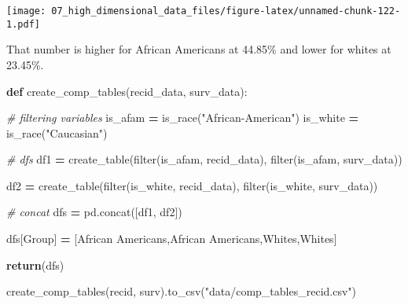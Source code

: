 \documentclass[
]{book}
\newenvironment{Shaded}{\begin{snugshade}}{\end{snugshade}}
\newcommand{\BuiltInTok}[1]{#1}
\newcommand{\CommentTok}[1]{\textcolor[rgb]{0.56,0.35,0.01}{\textit{#1}}}
\newcommand{\ControlFlowTok}[1]{\textcolor[rgb]{0.13,0.29,0.53}{\textbf{#1}}}
\newcommand{\KeywordTok}[1]{\textcolor[rgb]{0.13,0.29,0.53}{\textbf{#1}}}
\newcommand{\NormalTok}[1]{#1}
\newcommand{\OperatorTok}[1]{\textcolor[rgb]{0.81,0.36,0.00}{\textbf{#1}}}
\newcommand{\StringTok}[1]{\textcolor[rgb]{0.31,0.60,0.02}{#1}}
\begin{document}
\texttt{[image: 07\_high\_dimensional\_data\_files/figure-latex/unnamed-chunk-122-1.pdf]}

That number is higher for African Americans at 44.85\% and lower for whites at 23.45\%.

\begin{Shaded}
\begin{Highlighting}[]

\KeywordTok{def}\NormalTok{ create\_comp\_tables(recid\_data, surv\_data):}
  
    \CommentTok{\# filtering variables }
\NormalTok{    is\_afam }\OperatorTok{=}\NormalTok{ is\_race(}\StringTok{"African{-}American"}\NormalTok{)}
\NormalTok{    is\_white }\OperatorTok{=}\NormalTok{ is\_race(}\StringTok{"Caucasian"}\NormalTok{)}
  
    \CommentTok{\# dfs }
\NormalTok{    df1 }\OperatorTok{=}\NormalTok{ create\_table(}\BuiltInTok{filter}\NormalTok{(is\_afam, recid\_data),}
                       \BuiltInTok{filter}\NormalTok{(is\_afam, surv\_data))}
  
\NormalTok{    df2 }\OperatorTok{=}\NormalTok{ create\_table(}\BuiltInTok{filter}\NormalTok{(is\_white, recid\_data), }
                       \BuiltInTok{filter}\NormalTok{(is\_white, surv\_data))}
  
    \CommentTok{\# concat }
\NormalTok{    dfs }\OperatorTok{=}\NormalTok{ pd.concat([df1, df2])}
    
\NormalTok{    dfs[}\StringTok{\textquotesingle{}Group\textquotesingle{}}\NormalTok{] }\OperatorTok{=}\NormalTok{ [}\StringTok{\textquotesingle{}African Americans\textquotesingle{}}\NormalTok{,}\StringTok{\textquotesingle{}African Americans\textquotesingle{}}\NormalTok{,}\StringTok{\textquotesingle{}Whites\textquotesingle{}}\NormalTok{,}\StringTok{\textquotesingle{}Whites\textquotesingle{}}\NormalTok{]}
    
    \ControlFlowTok{return}\NormalTok{(dfs)}
    
\end{Highlighting}
\end{Shaded}

\begin{Shaded}
\begin{Highlighting}[]

\NormalTok{create\_comp\_tables(recid, surv).to\_csv(}\StringTok{"data/comp\_tables\_recid.csv"}\NormalTok{)}
\end{Highlighting}
\end{Shaded}
\end{document}
